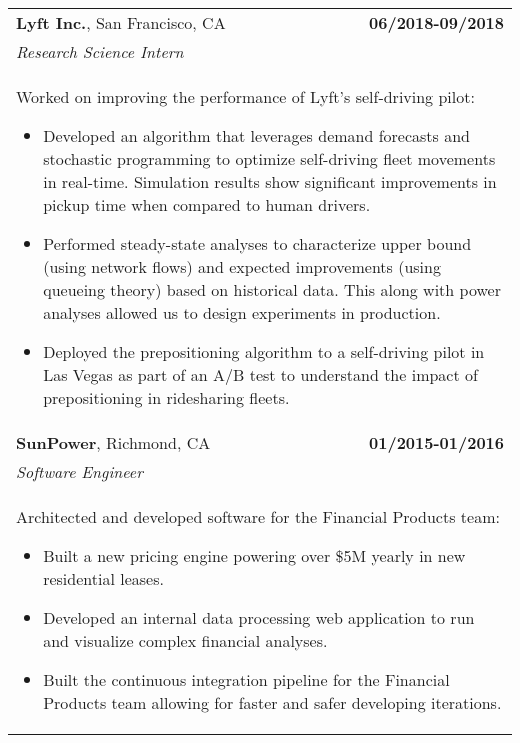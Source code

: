 \documentclass[a4paper,10pt]{article}
\begin{document}
\begin{tabularx}{\textwidth}{Xr}
 {\bf{Lyft Inc.}}, San Francisco, CA & \bf{06/2018-09/2018}\\
 \emph{Research Science Intern} &\\
 \multicolumn{2}{p{0.98\textwidth}}{
 Worked on improving the performance of Lyft's self-driving pilot:
 \begin{itemize}
 	\item Developed an algorithm that leverages demand forecasts and stochastic programming to optimize self-driving fleet movements in real-time. Simulation results show significant improvements in pickup time when compared to human drivers.
 	\item Performed steady-state analyses to characterize upper bound (using network flows) and expected improvements (using queueing theory) based on historical data. This along with power analyses allowed us to design experiments in production.
 	\item Deployed the prepositioning algorithm to a self-driving pilot in Las Vegas as part of an A/B test to understand the impact of prepositioning in ridesharing fleets.%
 \end{itemize}
 }\\

{\bf{SunPower}}, Richmond, CA & \bf{01/2015-01/2016}\\
\emph{Software Engineer} &\\
\multicolumn{2}{p{0.98\textwidth}}{
Architected and developed software for the Financial Products team:
\begin{itemize}
	\item Built a new pricing engine powering over \$5M  yearly in new residential leases.
	\item Developed an internal data processing web application to run and visualize complex financial analyses.
	\item Built the continuous integration pipeline for the Financial Products team allowing for faster and safer developing iterations.
\end{itemize}
}\\


\end{tabularx}
\end{document}
